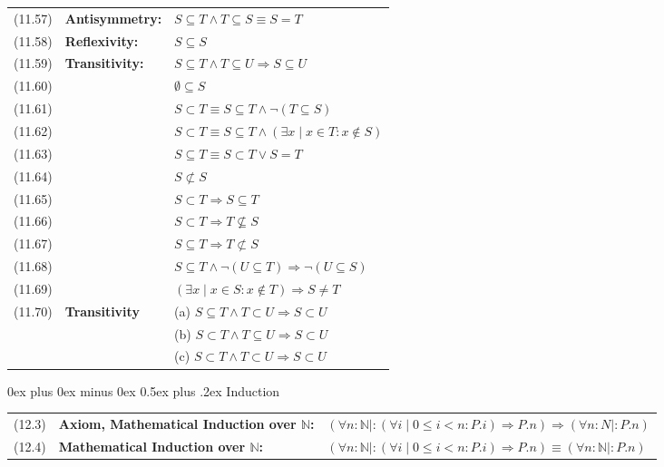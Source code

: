 \documentclass[letterpaper, 8pt]{extarticle}
\makeatletter
\renewcommand{\section}{\@startsection{section}{1}{0mm}%
                                {0ex plus 0ex minus 0ex}%
                                {0.5ex plus .2ex}%
                                {\normalfont\normalsize\bfseries}}
\newcommand{\To}{\Rightarrow}
\makeatother
\begin{document}
\begin{multicols*}{3}
\begin{tabulary}{\linewidth}{@{}lLL@{}}
        (11.57) & \textbf{Antisymmetry:} & $S \subseteq T \land T \subseteq S \equiv S = T$ \\
        (11.58) & \textbf{Reflexivity:} & $S \subseteq S$ \\
        (11.59) & \textbf{Transitivity:} & $S \subseteq T \land T \subseteq U \To S \subseteq U$ \\
        (11.60) & & $\emptyset \subseteq S$ \\
        (11.61) & & $S \subset T \equiv S \subseteq T \land \neg (T \subseteq S)$ \\
        (11.62) & & $S \subset T \equiv S \subseteq T \land (\exists x \mid x \in T : x \notin S)$ \\
        (11.63) & & $S \subseteq T \equiv S \subset T \lor S = T$ \\
        (11.64) & & $S \not\subset S$ \\
        (11.65) & & $S \subset T \To S \subseteq T$ \\
        (11.66) & & $S \subset T \To T \not\subseteq S$ \\
        (11.67) & & $S \subseteq T \To T \not\subset S$ \\
        (11.68) & & $S \subseteq T \land \neg (U \subseteq T) \To \neg(U \subseteq S)$ \\
        (11.69) & & $(\exists x \mid x \in S : x \notin T) \To S \neq T$ \\
        (11.70) & \textbf{Transitivity} & (a) $S \subseteq T \land T \subset U \To S \subset U$ \\
        & & (b) $S \subset T \land T \subseteq U \To S \subset U$ \\
        & & (c) $S \subset T \land T \subset U \To S \subset U$ \\
    \end{tabulary}

    \section{Induction}
    \begin{tabulary}{\linewidth}{@{}lLL@{}}
        (12.3) & \textbf{Axiom, Mathematical Induction over $\mathbb{N}$:} & $(\forall n : \mathbb{N} \mid : (\forall i \mid 0 \leq i < n : P.i) \To P.n) \To (\forall n : N \mid : P.n)$ \\
        (12.4) & \textbf{Mathematical Induction over $\mathbb{N}$:} & $(\forall n : \mathbb{N} \mid : (\forall i \mid 0 \leq i < n : P.i) \To P.n) \equiv (\forall n : \mathbb{N} \mid : P.n)$ \\
    \end{tabulary}

\end{multicols*}
\end{document}

